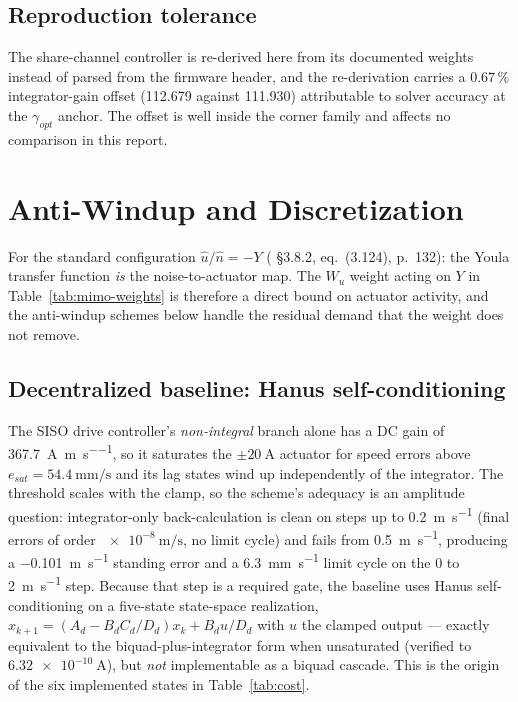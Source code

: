 \documentclass[energies,article,submit,pdftex,oneauthor]{Definitions/mdpi}
\begin{document}
\subsection{Reproduction tolerance}
The share-channel controller is re-derived here from its documented weights instead of parsed
from the firmware header, and the re-derivation carries a $0.67\,\%$ integrator-gain offset
(112.679 against 111.930) attributable to solver accuracy at the $\gamma_{opt}$ anchor. The offset
is well inside the corner family and affects no comparison in this report.

\section{Anti-Windup and Discretization}
\label{app:aw}

For the standard configuration
$\hat u/\hat n = -Y$ (\citep{assadian2020neoclassical} \S3.8.2, eq.~(3.124), p.~132): the
Youla transfer function \emph{is} the noise-to-actuator map. The $W_u$ weight acting on $Y$ in
Table~\ref{tab:mimo-weights} is therefore a direct bound on actuator activity, and the anti-windup
schemes below handle the residual demand that the weight does not remove.

\subsection{Decentralized baseline: Hanus self-conditioning}

The SISO drive controller's \emph{non-integral} branch alone has a DC gain of
\SI{367.7}{\ampere\per\meter\per\second}, so it saturates the $\pm\SI{20}{\ampere}$ actuator for
speed errors above $e_{sat} = \SI{54.4}{\milli\meter\per\second}$ and its lag states wind up
independently of the integrator. The threshold scales with the clamp, so the scheme's adequacy is
an amplitude question: integrator-only back-calculation is clean on steps up to
\SI{0.2}{\meter\per\second} (final errors of order $\SI{e-8}{\meter\per\second}$, no limit cycle)
and fails from \SI{0.5}{\meter\per\second}, producing a \SI{-0.101}{\meter\per\second} standing
error and a \SI{6.3}{\milli\meter\per\second} limit cycle on the 0 to \SI{2}{\meter\per\second}
step. Because that step is a required gate, the baseline uses Hanus
self-conditioning \citep{hanus1987conditioning} on a five-state state-space realization,
$x_{k+1} = (A_d - B_d C_d/D_d)x_k + B_d u/D_d$ with $u$ the clamped output --- exactly equivalent
to the biquad-plus-integrator form when unsaturated (verified to $\SI{6.32e-10}{\ampere}$), but
\emph{not} implementable as a biquad cascade. This is the origin of the six implemented states in
Table~\ref{tab:cost}.
\end{document}
